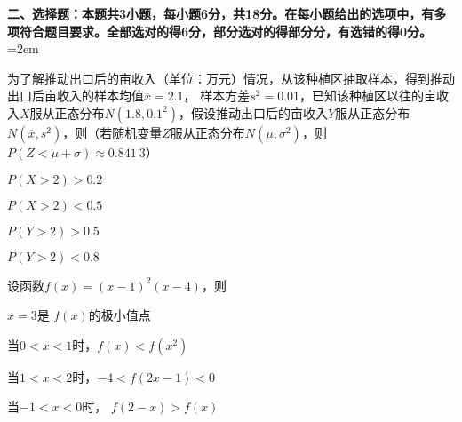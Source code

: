 \documentclass[a4paper, 11pt]{article}
\begin{document}
\noindent \textbf{二、选择题：本题共3小题，每小题6分，共18分。在每小题给出的选项中，有多项符合题目要求。全部选对的得6分，部分选对的得部分分，有选错的得0分。}\hangindent=2em

\begin{question}
	为了解推动出口后的亩收入（单位：万元）情况，从该种植区抽取样本，得到推动出口后亩收入的样本均值$\overline{x}=2.1$， 样本方差$s^2=0.01$，已知该种植区以往的亩收入$X$服从正态分布$N\left(1.8, 0.1^2\right)$，假设推动出口后的亩收入$Y$服从正态分布$N\left(\overline{x},s^2\right)$，则（若随机变量$Z$服从正态分布$N\left(\mu,\sigma^2\right)$，则$P(Z<\mu+\sigma)\approx 0.841\: 3$）
		
	\begin{choices}
		\item $P(X>2)>0.2$
		\item $P(X>2)<0.5$
		\item $P(Y>2)>0.5$
		\item $P(Y>2)<0.8$
	\end{choices}
\end{question}

\begin{question}
	设函数$f(x)=\left(x-1\right)^2\left(x-4\right)$，则
	\begin{choices}
		\item $x=3$是 $f(x)$的极小值点
		\item 当$0<x<1$时，$f(x)<f\left(x^2\right)$
		\item 当$1<x<2$时，$-4<f(2x-1)<0$
		\item 当$-1<x<0$时， $f(2-x)>f(x)$
	\end{choices}
	
\end{question}

\end{document}
